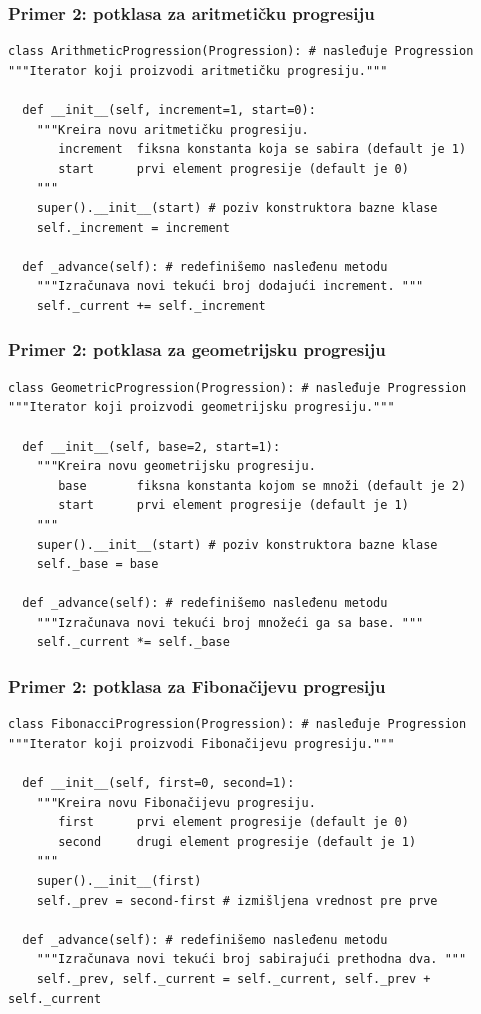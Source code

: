 \documentclass[compress,aspectratio=169]{beamer}
\begin{document}
\begin{frame}[fragile,shrink=20]
  \frametitle{Primer 2: potklasa za aritmetičku progresiju}
\begin{verbatim}
class ArithmeticProgression(Progression): # nasleđuje Progression
"""Iterator koji proizvodi aritmetičku progresiju."""

  def __init__(self, increment=1, start=0):
    """Kreira novu aritmetičku progresiju.
       increment  fiksna konstanta koja se sabira (default je 1)
       start      prvi element progresije (default je 0)
    """
    super().__init__(start) # poziv konstruktora bazne klase
    self._increment = increment
  
  def _advance(self): # redefinišemo nasleđenu metodu
    """Izračunava novi tekući broj dodajući increment. """
    self._current += self._increment
\end{verbatim}
\end{frame}

\begin{frame}[fragile,shrink=20]
  \frametitle{Primer 2: potklasa za geometrijsku progresiju}
\begin{verbatim}
class GeometricProgression(Progression): # nasleđuje Progression
"""Iterator koji proizvodi geometrijsku progresiju."""

  def __init__(self, base=2, start=1):
    """Kreira novu geometrijsku progresiju.
       base       fiksna konstanta kojom se množi (default je 2)
       start      prvi element progresije (default je 1)
    """
    super().__init__(start) # poziv konstruktora bazne klase
    self._base = base
  
  def _advance(self): # redefinišemo nasleđenu metodu
    """Izračunava novi tekući broj množeći ga sa base. """
    self._current *= self._base
\end{verbatim}
\end{frame}

\begin{frame}[fragile,shrink=20]
  \frametitle{Primer 2: potklasa za Fibonačijevu progresiju}
\begin{verbatim}
class FibonacciProgression(Progression): # nasleđuje Progression
"""Iterator koji proizvodi Fibonačijevu progresiju."""

  def __init__(self, first=0, second=1):
    """Kreira novu Fibonačijevu progresiju.
       first      prvi element progresije (default je 0)
       second     drugi element progresije (default je 1)
    """
    super().__init__(first)   
    self._prev = second-first # izmišljena vrednost pre prve
  
  def _advance(self): # redefinišemo nasleđenu metodu
    """Izračunava novi tekući broj sabirajući prethodna dva. """
    self._prev, self._current = self._current, self._prev + self._current
\end{verbatim}
\end{frame}
\end{document}
